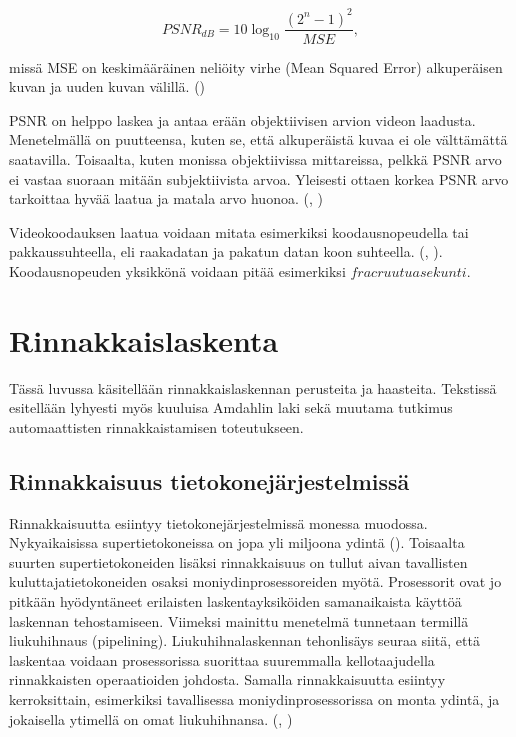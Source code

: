 \begin{center}
\begin{equation}PSNR_{dB} = 10\log_{10}\frac{(2^n - 1)^2}{MSE},\end{equation}
\end{center}

missä MSE on keskimääräinen neliöity virhe (Mean Squared Error) alkuperäisen 
kuvan ja uuden kuvan välillä. (\citealt{h264})

PSNR on helppo laskea ja antaa erään objektiivisen arvion videon laadusta.
Menetelmällä on puutteensa, kuten se, että alkuperäistä kuvaa ei ole
välttämättä saatavilla. Toisaalta, kuten monissa objektiivissa mittareissa,
pelkkä PSNR arvo ei vastaa suoraan mitään subjektiivista arvoa. Yleisesti
ottaen korkea PSNR arvo tarkoittaa hyvää laatua ja matala arvo huonoa.
(\citealt{h264}, \citealt{du})

Videokoodauksen laatua voidaan mitata esimerkiksi koodausnopeudella tai
pakkaussuhteella, eli raakadatan ja pakatun datan koon suhteella. (\citealt{li},
\citealt{xu}). Koodausnopeuden yksikkönä voidaan pitää esimerkiksi
$frac{ruutua}{sekunti}$.

\section{Rinnakkaislaskenta}
\label{chap:parallel}

Tässä luvussa käsitellään rinnakkaislaskennan perusteita ja haasteita.
Tekstissä esitellään lyhyesti
myös kuuluisa Amdahlin laki sekä muutama tutkimus automaattisten
rinnakkaistamisen toteutukseen.

\subsection{Rinnakkaisuus tietokonejärjestelmissä}

Rinnakkaisuutta esiintyy tietokonejärjestelmissä monessa muodossa.
Nykyaikaisissa supertietokoneissa on jopa yli miljoona ydintä (\citealt{top500}).
Toisaalta suurten supertietokoneiden lisäksi rinnakkaisuus on tullut aivan tavallisten
kuluttajatietokoneiden osaksi moniydinprosessoreiden myötä. Prosessorit ovat jo pitkään hyödyntäneet
erilaisten laskentayksiköiden samanaikaista käyttöä laskennan tehostamiseen.
Viimeksi mainittu menetelmä tunnetaan termillä liukuhihnaus (pipelining).
Liukuhihnalaskennan tehonlisäys seuraa siitä, että laskentaa voidaan
prosessorissa suorittaa suuremmalla kellotaajudella rinnakkaisten operaatioiden
johdosta. Samalla rinnakkaisuutta esiintyy kerroksittain, esimerkiksi
tavallisessa moniydinprosessorissa on monta ydintä, ja jokaisella ytimellä on
omat liukuhihnansa. (\citealt{intro}, \citealt{rauber})

